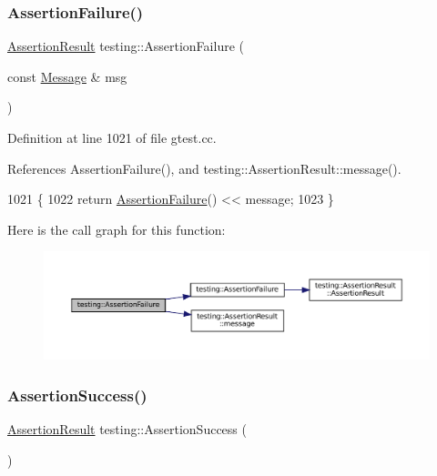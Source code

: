 \subsubsection{\texorpdfstring{Assertion\+Failure()}{AssertionFailure()}\hspace{0.1cm}{\footnotesize\ttfamily [2/2]}}
{\footnotesize\ttfamily \hyperlink{classtesting_1_1AssertionResult}{Assertion\+Result} testing\+::\+Assertion\+Failure (\begin{DoxyParamCaption}\item[{const \hyperlink{classtesting_1_1Message}{Message} \&}]{msg }\end{DoxyParamCaption})}



Definition at line 1021 of file gtest.\+cc.



References Assertion\+Failure(), and testing\+::\+Assertion\+Result\+::message().


\begin{DoxyCode}
1021                                                          \{
1022   \textcolor{keywordflow}{return} \hyperlink{namespacetesting_a75cb789614cb1c28c34627a4a3c053df}{AssertionFailure}() << message;
1023 \}
\end{DoxyCode}
Here is the call graph for this function\+:
\nopagebreak
\begin{figure}[H]
\begin{center}
\leavevmode
\includegraphics[width=350pt]{namespacetesting_a6bdf82adf159dcda822d75746937ffa9_cgraph}
\end{center}
\end{figure}
\mbox{\label{namespacetesting_ac1d0baedb17286c5c6c87bd1a45da8ac}} 
\subsubsection{\texorpdfstring{Assertion\+Success()}{AssertionSuccess()}}
{\footnotesize\ttfamily \hyperlink{classtesting_1_1AssertionResult}{Assertion\+Result} testing\+::\+Assertion\+Success (\begin{DoxyParamCaption}{ }\end{DoxyParamCaption})}



